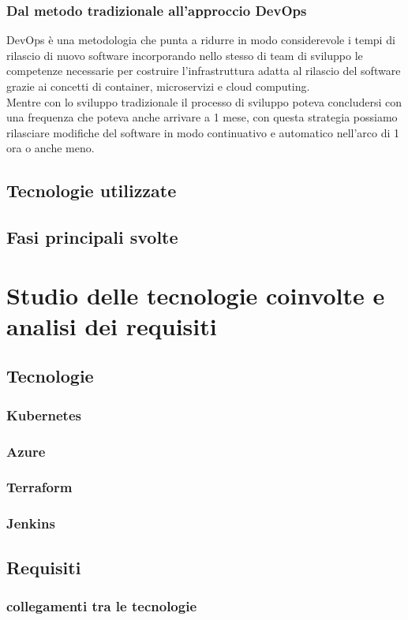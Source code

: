 \documentclass[a4paper,12pt]{report}
\begin{document}
\subsection{Dal metodo tradizionale all'approccio DevOps}
DevOps è una metodologia che punta a ridurre in modo considerevole i tempi di rilascio di nuovo software incorporando nello stesso di team di sviluppo le competenze necessarie per costruire l'infrastruttura adatta al rilascio del software grazie ai concetti di container, microservizi e cloud computing.\\
Mentre con lo sviluppo tradizionale il processo di sviluppo poteva concludersi con una frequenza che poteva anche arrivare a 1 mese, con questa strategia possiamo rilasciare modifiche del software in modo continuativo e automatico nell'arco di 1 ora o anche meno.
\section{Tecnologie utilizzate}
\section{Fasi principali svolte}

\chapter{Studio delle tecnologie coinvolte e analisi dei requisiti}
\section{Tecnologie}
\subsection{Kubernetes}
\subsection{Azure}
\subsection{Terraform}
\subsection{Jenkins}
\section{Requisiti}
\subsection{collegamenti tra le tecnologie}
\end{document}
